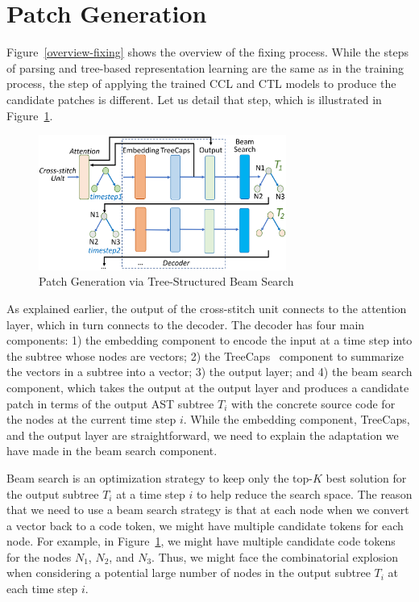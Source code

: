 \section{Patch Generation}
\label{sec:patch-gen}

Figure~\ref{overview-fixing} shows the overview of the fixing process.
While the steps of parsing and tree-based representation learning are
the same as in the training process, the step of applying the trained
CCL and CTL models to produce the candidate patches is
different. Let us detail that step, which is illustrated in
Figure~\ref{fig:patch-gen}.

\begin{figure}[t]
	\centering
	\includegraphics[width=3.2in]{graphs/beam-search.png}
	\caption{Patch Generation via Tree-Structured Beam Search}
	\label{fig:patch-gen}
\end{figure}

As explained earlier, the output of the cross-stitch unit connects to
the attention layer, which in turn connects to the decoder. The
decoder has four main components: 1) the embedding component to encode
the input at a time step into the subtree whose nodes are vectors; 2)
the TreeCaps~\cite{bui2021treecaps} component to summarize the vectors
in a subtree into a vector; 3) the output layer; and 4) the beam
search component, which takes the output at the output layer and
produces a candidate patch in terms of the output AST subtree $T_i$
with the concrete source code for the nodes at the current time step
$i$.  While the embedding component, TreeCaps, and the output layer
are straightforward, we need to explain the adaptation we have made in
the beam search component.

Beam search is an optimization strategy to keep only the top-$K$ best
solution for the output subtree $T_i$ at a time step $i$ to help
reduce the search space. The reason that we need to use a beam search
strategy is that at each node when we convert a vector back to a code
token, we might have multiple candidate tokens for each node. For
example, in Figure~\ref{fig:patch-gen}, we might have multiple
candidate code tokens for the nodes $N_1$, $N_2$, and $N_3$. Thus, we
might face the combinatorial explosion when considering a potential
large number of nodes in the output subtree $T_i$ at each time step
$i$.

